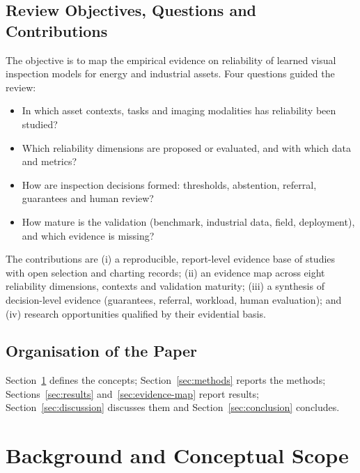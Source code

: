 \documentclass[journal]{IEEEtran}
\begin{document}
\subsection{Review Objectives, Questions and Contributions}
The objective is to map the empirical evidence on reliability of learned visual inspection models for energy and industrial assets. Four questions guided the review:
\begin{itemize}
\item[RQ1] In which asset contexts, tasks and imaging modalities has reliability been studied?
\item[RQ2] Which reliability dimensions are proposed or evaluated, and with which data and metrics?
\item[RQ3] How are inspection decisions formed: thresholds, abstention, referral, guarantees and human review?
\item[RQ4] How mature is the validation (benchmark, industrial data, field, deployment), and which evidence is missing?
\end{itemize}
The contributions are (i) a reproducible, report-level evidence base of \nIncluded{} studies with open selection and charting records; (ii) an evidence map across eight reliability dimensions, contexts and validation maturity; (iii) a synthesis of decision-level evidence (guarantees, referral, workload, human evaluation); and (iv) research opportunities qualified by their evidential basis.

\subsection{Organisation of the Paper}
Section~\ref{sec:background} defines the concepts; Section~\ref{sec:methods} reports the methods; Sections~\ref{sec:results} and~\ref{sec:evidence-map} report results; Section~\ref{sec:discussion} discusses them and Section~\ref{sec:conclusion} concludes.

\section{Background and Conceptual Scope}
\label{sec:background}
\end{document}
